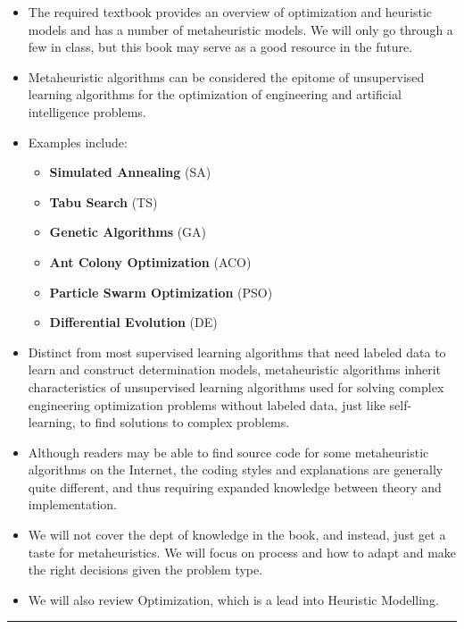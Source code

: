 \documentclass[
  letterpaper,
  DIV=11,
  numbers=noendperiod]{scrreprt}
\providecommand{\tightlist}{%
  \setlength{\itemsep}{0pt}\setlength{\parskip}{0pt}}\usepackage{longtable,booktabs,array}
\begin{document}
\begin{itemize}
\item
  The required textbook provides an overview of optimization and
  heuristic models and has a number of metaheuristic models. We will
  only go through a few in class, but this book may serve as a good
  resource in the future.
\item
  Metaheuristic algorithms can be considered the epitome of unsupervised
  learning algorithms for the optimization of engineering and artificial
  intelligence problems.
\item
  Examples include:

  \begin{itemize}
  \tightlist
  \item
    \textbf{Simulated Annealing} (SA)
  \item
    \textbf{Tabu Search} (TS)
  \item
    \textbf{Genetic Algorithms} (GA)
  \item
    \textbf{Ant Colony Optimization} (ACO)
  \item
    \textbf{Particle Swarm Optimization} (PSO)
  \item
    \textbf{Differential Evolution} (DE)
  \end{itemize}
\item
  Distinct from most supervised learning algorithms that need labeled
  data to learn and construct determination models, metaheuristic
  algorithms inherit characteristics of unsupervised learning algorithms
  used for solving complex engineering optimization problems without
  labeled data, just like self-learning, to find solutions to complex
  problems.
\item
  Although readers may be able to find source code for some
  metaheuristic algorithms on the Internet, the coding styles and
  explanations are generally quite different, and thus requiring
  expanded knowledge between theory and implementation.
\item
  We will not cover the dept of knowledge in the book, and instead, just
  get a taste for metaheuristics. We will focus on process and how to
  adapt and make the right decisions given the problem type.
\item
  We will also review Optimization, which is a lead into Heuristic
  Modelling.
\end{itemize}

\begin{center}\rule{0.5\linewidth}{0.5pt}\end{center}
\end{document}
